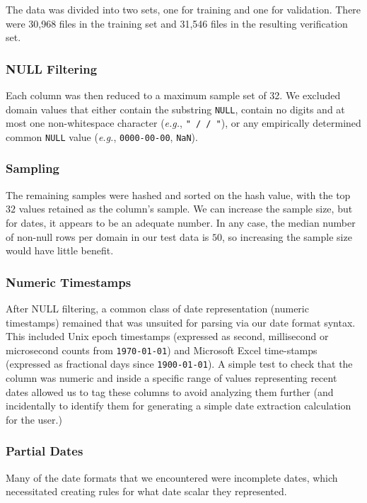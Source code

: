 The data was divided into two sets, one for training and one for validation. There were 30,968 files in the training set and 31,546 files in the resulting verification set.


\subsubsection{NULL Filtering}
Each column was then reduced to a maximum sample set of 32. We excluded domain values that either contain the substring \texttt{NULL}, contain no digits and at most one non-whitespace character (\textit{e.g.}, \texttt{" / / "}), or any empirically determined common \texttt{NULL} value (\textit{e.g.}, \texttt{0000-00-00}, \texttt{NaN}).

\subsubsection{Sampling}
The remaining samples were hashed and sorted on the hash value, with the top $32$ values retained as the column's sample. We can increase the sample size, but for dates, it appears to be an adequate number. In any case, the median number of non-null rows per domain in our test data is $50$, so increasing the sample size would have little benefit.

\subsubsection{Numeric Timestamps}
After NULL filtering, a common class of date representation (numeric timestamps) remained that was unsuited for parsing via our date format syntax. This included Unix epoch timestamps (expressed as second, millisecond or microsecond counts from \texttt{1970-01-01}) and Microsoft Excel time-stamps (expressed as fractional days since \texttt{1900-01-01}). A simple test to check that the column was numeric and inside a specific range of values representing recent dates allowed us to tag these columns to avoid analyzing them further (and incidentally to identify them for generating a simple date extraction calculation for the user.)


\subsubsection{Partial Dates}
Many of the date formats that we encountered were incomplete dates, which necessitated creating rules for what date scalar they represented.

